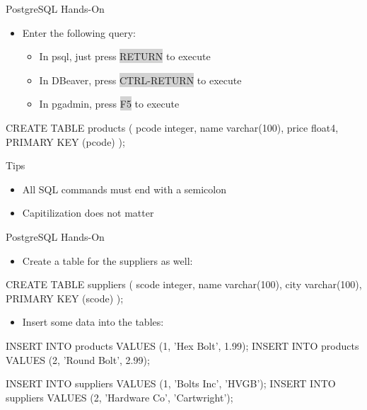 \documentclass[ignorenonframetext,xcolor=x11names]{beamer}
\begin{document}
\begin{frame}[fragile]{PostgreSQL Hands-On}
\begin{itemize}
\item Enter the following query:
\begin{itemize}
    \item In psql, just press \colorbox{lightgray}{RETURN} to execute
    \item In DBeaver, press \colorbox{lightgray}{CTRL-RETURN} to execute
    \item In pgadmin, press \colorbox{lightgray}{F5} to execute
\end{itemize}
\end{itemize}
\footnotesize
\begin{sqlcode}
CREATE TABLE products (
  pcode integer,
  name  varchar(100),
  price float4,
  PRIMARY KEY (pcode) );
\end{sqlcode}
\normalsize
\vspace{-5mm}
\begin{block}{Tips}
\begin{itemize}
  \item All SQL commands must end with a semicolon
  \item Capitilization does not matter
\end{itemize}
\end{block}
\end{frame}

\begin{frame}[fragile]{PostgreSQL Hands-On}
\begin{itemize}
  \item Create a table for the suppliers as well:
\end{itemize}
\footnotesize
\begin{sqlcode}
CREATE TABLE suppliers (
  scode integer,
  name  varchar(100),
  city  varchar(100),
  PRIMARY KEY (scode) );
\end{sqlcode}
\normalsize
\begin{itemize}
  \item Insert some data into the tables:
\end{itemize}
\footnotesize
\begin{sqlcode}
INSERT INTO products VALUES (1, 'Hex Bolt', 1.99);
INSERT INTO products VALUES (2, 'Round Bolt', 2.99);

INSERT INTO suppliers VALUES (1, 'Bolts Inc', 'HVGB');
INSERT INTO suppliers 
    VALUES (2, 'Hardware Co', 'Cartwright');
\end{sqlcode}
\vspace{5mm}
\end{frame}
\end{document}
